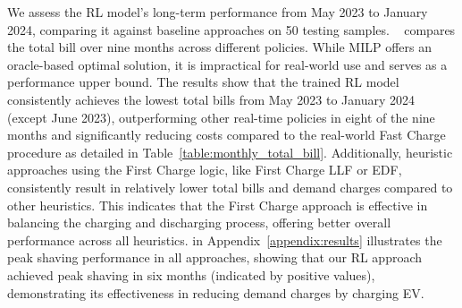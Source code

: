 We assess the RL model's long-term performance from May 2023 to January 2024, comparing it against baseline approaches on 50 testing samples. 
{\color{black}~ compares the total bill over nine months across different policies. While MILP offers an oracle-based optimal solution, it is impractical for real-world use and serves as a performance upper bound. The results show that the trained RL model consistently achieves the lowest total bills from May 2023 to January 2024 (except June 2023), outperforming other real-time policies in eight of the nine months and significantly reducing costs compared to the real-world Fast Charge procedure as detailed in Table~\ref{table:monthly_total_bill}.
Additionally, heuristic approaches using the First Charge logic, like First Charge LLF or EDF, consistently result in relatively lower total bills and demand charges compared to other heuristics. This indicates that the First Charge approach is effective in balancing the charging and discharging process, offering better overall performance across all heuristics.
\color{black}
  in Appendix~\ref{appendix:results} illustrates the peak shaving performance in all approaches, showing that our RL approach achieved peak shaving in six months (indicated by positive values), demonstrating its effectiveness in reducing demand charges by charging EV.
}
